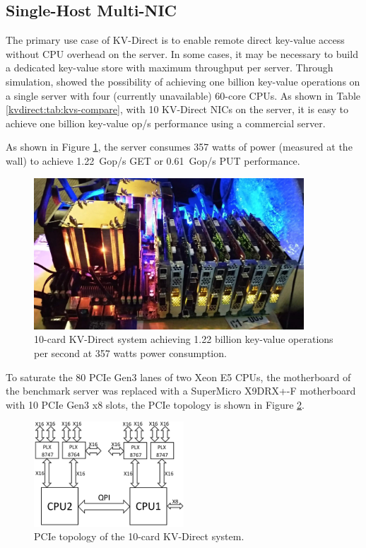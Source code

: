 \subsection{Single-Host Multi-NIC}
\label{kvdirect:sec:multi-nic}

The primary use case of KV-Direct is to enable remote direct key-value access without CPU overhead on the server. In some cases, it may be necessary to build a dedicated key-value store with maximum throughput per server. Through simulation, \cite {li2016full} showed the possibility of achieving one billion key-value operations on a single server with four (currently unavailable) 60-core CPUs. As shown in Table \ref{kvdirect:tab:kvs-compare}, with 10 KV-Direct NICs on the server, it is easy to achieve one billion key-value op/s performance using a commercial server.

As shown in Figure \ref{kvdirect:fig:photo}, the server consumes 357 watts of power (measured at the wall) to achieve 1.22~Gop/s GET or 0.61~Gop/s PUT performance.

\begin{figure}[htbp]
	\centering
	\includegraphics[width=0.9\textwidth]{figure/kvdirect_photo.jpg}
	\caption{10-card KV-Direct system achieving 1.22 billion key-value operations per second at 357 watts power consumption.}
	\label{kvdirect:fig:photo}
\end{figure}

To saturate the 80 PCIe Gen3 lanes of two Xeon E5 CPUs, the motherboard of the benchmark server was replaced with a SuperMicro X9DRX+-F motherboard with 10 PCIe Gen3 x8 slots, the PCIe topology is shown in Figure \ref{kvdirect:fig:pcie_topology}.

\begin{figure}[htbp]
	\centering
	\includegraphics[width=0.5\textwidth]{figure/pcie_topology.PNG}
	\caption{PCIe topology of the 10-card KV-Direct system.}
	\label{kvdirect:fig:pcie_topology}
\end{figure}

